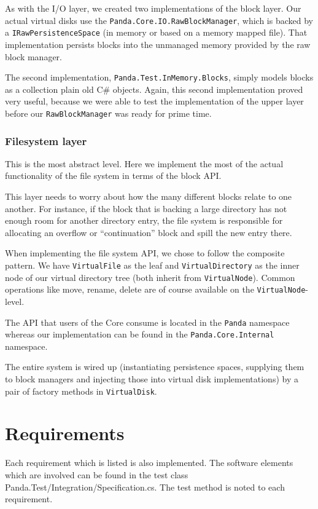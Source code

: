 \documentclass[a4paper,12pt]{article}
\begin{document}
As with the I/O layer, we created two implementations of the block layer.
Our actual virtual disks use the \texttt{Panda.Core.IO.RawBlockManager}, which is backed by a \texttt{IRawPersistenceSpace} (in memory or based on a memory mapped file).
That implementation persists blocks into the unmanaged memory provided by the raw block manager.

The second implementation, \texttt{Panda.Test.InMemory.Blocks}, simply models blocks as a collection plain old C\# objects.
Again, this second implementation proved very useful, because we were able to test the implementation of the upper layer before our \texttt{RawBlockManager} was ready for prime time.

\subsubsection{Filesystem layer}

This is the most abstract level. 
Here we implement the most of the actual functionality of the file system in terms of the block API.

This layer needs to worry about how the many different blocks relate to one another.
For instance, if the block that is backing a large directory has not enough room for another directory entry, the file system is responsible for allocating an overflow or ``continuation'' block and spill the new entry there.

When implementing the file system API, we chose to follow the composite pattern. 
We have \texttt{VirtualFile} as the leaf and \texttt{VirtualDirectory} as the inner node of our virtual directory tree (both inherit from \texttt{VirtualNode}).
Common operations like move, rename, delete are of course available on the \texttt{VirtualNode}-level.

The API that users of the Core consume is located in the \texttt{Panda} namespace whereas our implementation can be found in the \texttt{Panda.Core.Internal} namespace. 

The entire system is wired up (instantiating persistence spaces, supplying them to block managers and injecting those into virtual disk implementations) by a pair of factory methods in \texttt{VirtualDisk}.

\section{Requirements}

Each requirement which is listed is also implemented. The software elements which are involved can be found in the test class \hbox{Panda.Test/Integration/Specification.cs}. The test method is noted to each requirement.
\end{document}
